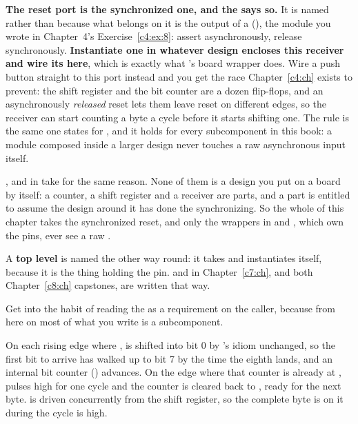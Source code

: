 \textbf{The reset port is the synchronized one, and the  says so.} It is named
 rather than  because what belongs on it is the output of a
 (), the module you wrote in Chapter~4's Exercise~\ref{c4:ex:8}:
assert asynchronously, release synchronously. \textbf{Instantiate one in whatever design encloses
this receiver and wire its  here}, which is exactly what 's board
wrapper does. Wire a push button straight to this port instead and you get the race
Chapter~\ref{c4:ch} exists to prevent: the shift register and the bit counter are a dozen
flip-flops, and an asynchronously \emph{released} reset lets them leave reset on different edges,
so the receiver can start counting a byte a cycle before it starts shifting one. The rule is the
same one  states for , and it holds for every subcomponent in this book:
a module composed inside a larger design never touches a raw asynchronous input itself.

,  and  in  take 
for the same reason. None of them is a design you put on a board by itself: a counter, a shift
register and a receiver are parts, and a part is entitled to assume the design around it has done
the synchronizing. So the whole of this chapter takes the synchronized reset, and only the wrappers
in  and , which own the pins, ever see a raw .

A \textbf{top level} is named the other way round: it takes  and instantiates
 itself, because it is the thing holding the pin.  and
 in Chapter~\ref{c7:ch}, and both Chapter~\ref{c8:ch} capstones, are written that
way.

Get into the habit of reading the  as a requirement on the caller, because from here on
most of what you write is a subcomponent.

On each rising edge where ,  is shifted into bit 0 by
's idiom unchanged, so the first bit to arrive has walked up to bit 7 by the time the
eighth lands, and an internal  bit counter () advances. On
the edge where that counter is already at ,  pulses high for one cycle and
the counter is cleared back to , ready for the next byte.  is driven
concurrently from the shift register, so the complete byte is on it during the cycle
 is high.

